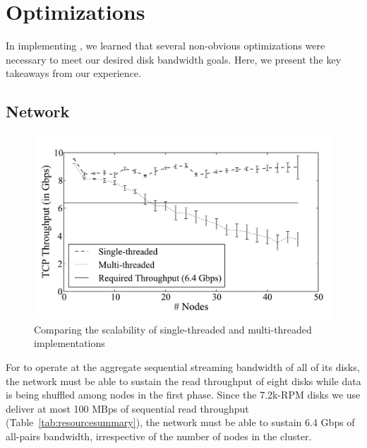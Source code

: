 \section{Optimizations}
\label{sec:optimizations}

In implementing \tritonsort, we learned that several non-obvious optimizations
were necessary to meet our desired disk bandwidth goals.  Here, we present the
key takeaways from our experience.

\subsection{Network}
\label{sec:fastnetwork}

\begin{figure}
  \centering
  \includegraphics[width=\columnwidth]{tritonsort/graphs/netscalability.pdf}

\caption{Comparing the scalability of single-threaded and
  multi-threaded \receiver implementations}
  \label{fig:net_scalability}
\end{figure}

For \tritonsort to operate at the aggregate sequential streaming bandwidth of
all of its disks, the network must be able to sustain the read throughput of
eight disks while data is being shuffled among nodes in the first phase.  Since
the 7.2k-RPM disks we use deliver at most 100 MBps of sequential read
throughput (Table~\ref{tab:resourcesummary}), the network must be able to
sustain 6.4 Gbps of all-pairs bandwidth, irrespective of the number of nodes in
the cluster.

